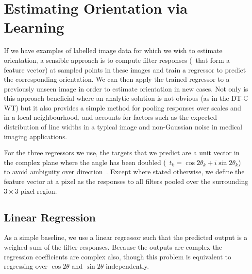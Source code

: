 \documentclass[10pt,twocolumn,letterpaper]{article}
\def\dtcwt{DT-$\mathbb{C}$WT}
\newcommand{\comment}[1]{}
\begin{document}
\section{Estimating Orientation via Learning}
\label{s:learning}
If we have examples of labelled image data for which we wish to estimate orientation, a sensible approach is to compute filter responses (\ie~that form a feature vector) at sampled points in these images and train a regressor to predict the corresponding orientation. We can then apply the trained regressor to a previously unseen image in order to estimate orientation in new cases. Not only is this approach beneficial where an analytic solution is not obvious (as in the \dtcwt) but it also provides a simple method for pooling responses over scales and in a local neighbourhood, and accounts for factors such as the expected distribution of line widths in a typical image and non-Gaussian noise in medical imaging applications.

For the three regressors we use, the targets that we predict are a unit vector in the complex plane where the angle has been doubled (\ie~$t_k = \cos 2\theta_k + i\sin 2\theta_k$) to avoid ambiguity over direction~\cite{Mardia_Jupp_00}. Except where stated otherwise, we define the feature vector at a pixel as the responses to all filters pooled over the surrounding $3{\times}3$ pixel region.


\subsection{Linear Regression}
\label{s:learning_linear}
As a simple baseline, we use a linear regressor such that the predicted output is a weighed sum of the filter responses. Because the outputs are complex the regression coefficients are complex also, though this problem is equivalent to regressing over $\cos 2\theta$ and $\sin 2\theta$ independently.

\comment{We may want to reintroduce a note here that there are two solutions to the orientation, and that this cannot be estimated from a linear regression alone (at least for the double angle representations)}

\end{document}
